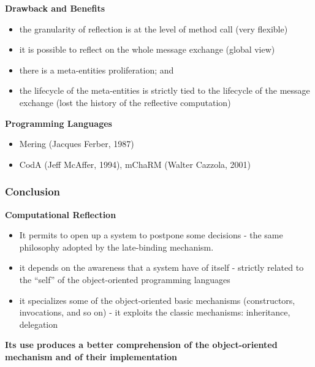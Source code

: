 \textbf{Drawback and Benefits}
\begin{itemize}
	\item the granularity of reflection is at the level of method call (very flexible)
	\item it is possible to reflect on the whole message exchange (global view)
	\item there is a meta-entities proliferation; and
	\item the lifecycle of the meta-entities is strictly tied to the lifecycle of the message exchange (lost the history of the reflective computation)
\end{itemize}

\textbf{Programming Languages}
\begin{itemize}
	\item Mering (Jacques Ferber, 1987)
	\item  CodA (Jeff McAffer, 1994), mChaRM (Walter Cazzola, 2001)
\end{itemize}

\subsubsection{Conclusion}
\textbf{Computational Reflection}
\begin{itemize}
	\item It permits to open up a system to postpone some decisions
	- the same philosophy adopted by the late-binding mechanism.
	\item it depends on the awareness that a system have of itself
	- strictly related to the “self” of the object-oriented programming languages
	\item it specializes some of the object-oriented basic mechanisms (constructors, invocations, and so on)
	- it exploits the classic mechanisms: inheritance, delegation
\end{itemize}

\textbf{Its use produces a better comprehension of the object-oriented mechanism and of their implementation}




